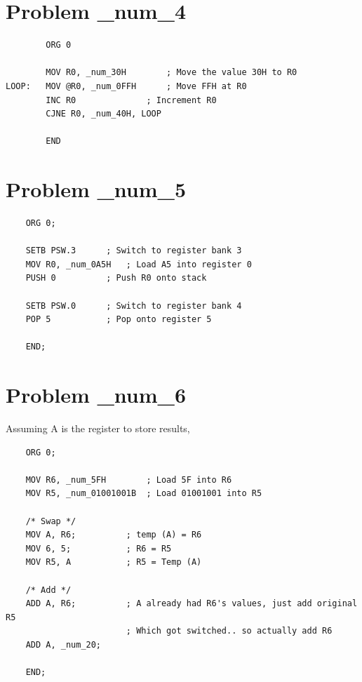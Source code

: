 \documentclass[12pt]{article}
\begin{document}
\section*{Problem \_num_4}
\begin{verbatim}
        ORG 0

        MOV R0, _num_30H        ; Move the value 30H to R0
LOOP:   MOV @R0, _num_0FFH      ; Move FFH at R0
        INC R0              ; Increment R0
        CJNE R0, _num_40H, LOOP

        END
\end{verbatim}

\section*{Problem \_num_5}
\begin{verbatim}
    ORG 0;

    SETB PSW.3      ; Switch to register bank 3
    MOV R0, _num_0A5H   ; Load A5 into register 0
    PUSH 0          ; Push R0 onto stack

    SETB PSW.0      ; Switch to register bank 4
    POP 5           ; Pop onto register 5

    END;
\end{verbatim}

\section*{Problem \_num_6}
Assuming A is the register to store results,

\begin{verbatim}
    ORG 0;

    MOV R6, _num_5FH        ; Load 5F into R6
    MOV R5, _num_01001001B  ; Load 01001001 into R5

    /* Swap */
    MOV A, R6;          ; temp (A) = R6
    MOV 6, 5;           ; R6 = R5
    MOV R5, A           ; R5 = Temp (A)

    /* Add */
    ADD A, R6;          ; A already had R6's values, just add original R5
                        ; Which got switched.. so actually add R6
    ADD A, _num_20;

    END;
\end{verbatim}
\end{document}
